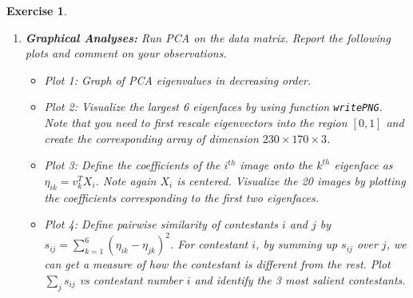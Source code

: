 \documentclass[12pt]{article}
\theoremstyle{colon}
\newtheorem{exercise}{Exercise}
\begin{document}
\begin{exercise}
\begin{enumerate}[label=\arabic*)]
    \item \textbf{Graphical Analyses:} Run PCA on the data matrix. Report the following plots and comment on your observations.
      \begin{itemize}
        \item Plot 1: Graph of PCA eigenvalues in decreasing order.
        \item Plot 2: Visualize the largest 6 eigenfaces by using function \texttt{write\-PNG}. Note that you need to first rescale eigenvectors into the region $[0,1]$ and create the corresponding array of dimension $230 \times 170 \times 3$.
        \item Plot 3: Define the coefficients of the $i^{th}$ image onto the $k^{th}$ eigenface as $\eta_{ik} = v_k^T X_i$. Note again $X_i$ is centered. Visualize the 20 images by plotting the coefficients corresponding to the first two eigenfaces.
        \item Plot 4: Define pairwise similarity of contestants $i$ and $j$ by $s_{ij} = \sum_{k=1}^6 (\eta_{ik} - \eta_{jk})^2$. For contestant $i$, by summing up $s_{ij}$ over $j$, we can get a measure of how the contestant is different from the rest. Plot $\sum_j s_{ij}$ vs contestant number $i$ and identify the 3 most salient contestants.
      \end{itemize}
  \end{enumerate}
\end{exercise}
\end{document}
